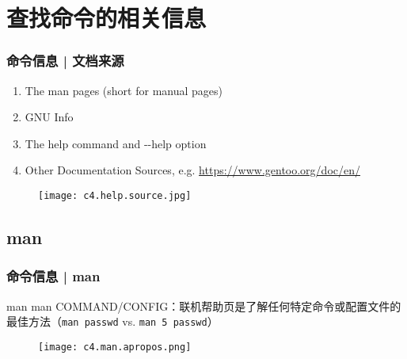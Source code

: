 \section{查找命令的相关信息}
\begin{frame}
  \frametitle{命令信息 | 文档来源}
  \begin{enumerate}
    \item The man pages (short for manual pages)
    \item GNU Info
    \item The help command and -\!-help option
    \item Other Documentation Sources, e.g. \href{https://www.gentoo.org/doc/en/}{https://www.gentoo.org/doc/en/}
  \end{enumerate}
  \begin{figure}
    \centering
    \texttt{[image: c4.help.source.jpg]}
  \end{figure}
\end{frame}

\subsection{man}
\begin{frame}[fragile]
  \frametitle{命令信息 | man}
  \begin{block}{man}
    \alert{man COMMAND/CONFIG}：联机帮助页是了解任何特定命令或配置文件的最佳方法（\verb|man passwd| vs. \verb|man 5 passwd|）
  \end{block}
  \begin{figure}
    \centering
    \texttt{[image: c4.man.apropos.png]}
  \end{figure}
\end{frame}

